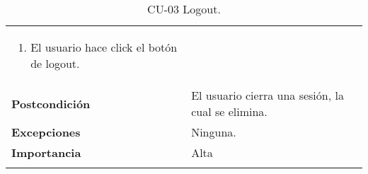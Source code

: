 \begin{longtable}[H]{@{}ll@{}}
\begin{minipage}[t]{0.68\columnwidth}
\begin{enumerate}
\def\labelenumi{\arabic{enumi}.}
\tightlist
\item
  El usuario hace click el botón de logout.
\end{enumerate}\strut
\end{minipage}\tabularnewline
\begin{minipage}[t]{0.26\columnwidth}\raggedright\strut
\textbf{Postcondición}\strut
\end{minipage} & \begin{minipage}[t]{0.68\columnwidth}\raggedright\strut%
El usuario cierra una sesión, la cual se elimina.\strut
\end{minipage}\tabularnewline
\begin{minipage}[t]{0.26\columnwidth}\raggedright\strut
\textbf{Excepciones}\strut
\end{minipage} & \begin{minipage}[t]{0.68\columnwidth}\raggedright\strut%
Ninguna.\strut
\end{minipage}\tabularnewline
\begin{minipage}[t]{0.26\columnwidth}\raggedright\strut
\textbf{Importancia}\strut
\end{minipage} & \begin{minipage}[t]{0.68\columnwidth}\raggedright\strut%
Alta\strut
\end{minipage}\tabularnewline
\bottomrule%
\caption{CU-03 Logout.}
\end{longtable}


